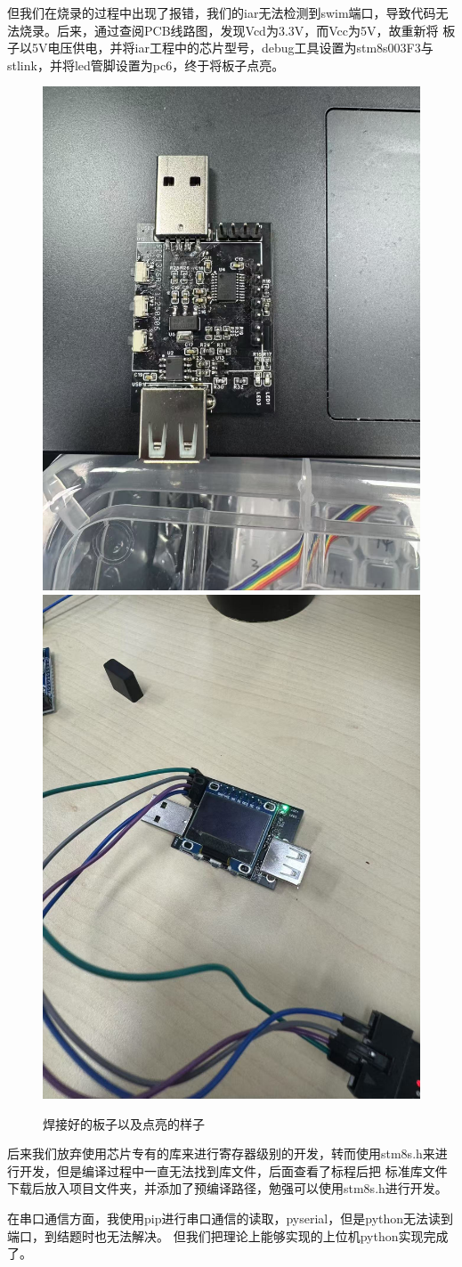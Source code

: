 \documentclass{ctexart}
\begin{document}
但我们在烧录的过程中出现了报错，我们的iar无法检测到swim端口，导致代码无法烧录。后来，通过查阅PCB线路图，发现Vcd为3.3V，而Vcc为5V，故重新将
板子以5V电压供电，并将iar工程中的芯片型号，debug工具设置为stm8s003F3与stlink，并将led管脚设置为pc6，终于将板子点亮。

\begin{figure}[H]
\centering
\includegraphics[width = .2\textwidth]{./figures/c9c82cc123bb287693d88c08433309e.jpg}\\
\includegraphics[width = .2\textwidth]{./figures/c73295887824945795a9509819d33a7.jpg}
\caption{焊接好的板子以及点亮的样子}
\end{figure}

后来我们放弃使用芯片专有的库来进行寄存器级别的开发，转而使用stm8s.h来进行开发，但是编译过程中一直无法找到库文件，后面查看了标程后把
标准库文件下载后放入项目文件夹，并添加了预编译路径，勉强可以使用stm8s.h进行开发。

在串口通信方面，我使用pip进行串口通信的读取，pyserial，但是python无法读到端口，到结题时也无法解决。
但我们把理论上能够实现的上位机python实现完成了。
\end{document}
